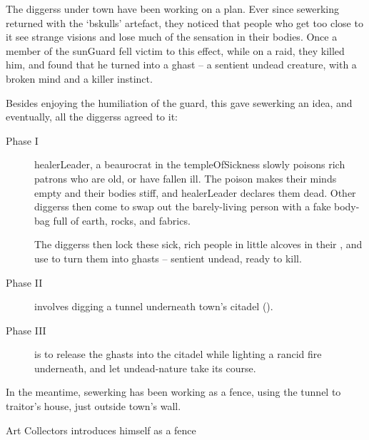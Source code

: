 \label{sewerking}

\begin{exampletext}
  \noindent
  The \glspl{diggers} under \gls{town} have been working on a plan.
  Ever since \gls{sewerking} returned with the `\gls{bskulls}' \gls{artefact}, they noticed that people who get too close to it see strange visions and lose much of the sensation in their bodies.
  Once a member of the \gls{sunGuard} fell victim to this effect, while on a raid, they killed him, and found that he turned into a ghast -- a sentient undead creature, with a broken mind and a killer instinct.%

  Besides enjoying the humiliation of the guard, this gave \gls{sewerking} an idea, and eventually, all the \glspl{diggers} agreed to it:

\end{exampletext}

\label{ghastPlan}
\begin{description}
  \item[Phase I]
  \Gls{healerLeader}, a beaurocrat in the \gls{templeOfSickness} slowly poisons rich patrons who are old, or have fallen ill.
  The poison makes their minds empty and their bodies stiff, and \gls{healerLeader} declares them dead.
  Other \glspl{diggers} then come to swap out the barely-living person with a fake body-bag full of earth, rocks, and fabrics.

  The \glspl{diggers} then lock these sick, rich people in little alcoves in their , and use  to turn them into ghasts -- sentient undead, ready to kill.
  \item[Phase II]
  involves digging a tunnel underneath \gls{town}'s citadel ().
  \item[Phase III]
  is to release the ghasts into the citadel while lighting a rancid fire underneath, and let undead-nature take its course.
\end{description}
\null

In the meantime, \gls{sewerking} has been working as a fence, using the tunnel to \gls{traitor}'s house, just outside \gls{town}'s wall.

{Art Collectors}%
{ introduces himself as a fence}%
\label{sewerPt1}

